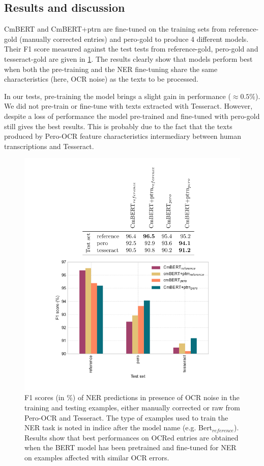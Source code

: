 \subsection{Results and discussion}


CmBERT and CmBERT+ptrn are fine-tuned on the training sets from reference-gold (manually corrected entries) and pero-gold to produce 4 different models.
Their F1 score measured against the test tests from reference-gold, pero-gold and tesseract-gold are given in \cref{fig:exp_2_eval_ner}.
The results clearly show that models perform best when both the pre-training and the NER fine-tuning share the same characteristics (here, OCR noise) as the texts to be processed.

In our tests, pre-training the model brings a slight gain in performance ($\approx 0.5\%$).
We did not pre-train or fine-tune with texts extracted with Tesseract.
However, despite a loss of performance the model pre-trained and fine-tuned with pero-gold still gives the best results.
This is probably due to the fact that the texts produced by Pero-OCR feature characteristics intermediary between human transcriptions and Tesseract.

\begin{figure}
    \centering
    \includegraphics[width=\textwidth]{figs/eval-ner-exp2.pdf}
    \caption{F1 scores (in \%) of NER predictions in presence of OCR noise in the training and testing examples, either manually corrected or raw from Pero-OCR and Tesseract. The type of examples used to train the NER task is noted in indice after the model name (e.g. Bert$_{reference}$). Results show that best performances on OCRed entries are obtained when the BERT model has been pretrained and fine-tuned for NER on examples affected with similar OCR errors.}
    \label{fig:exp_2_eval_ner}
\end{figure}

